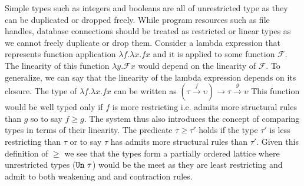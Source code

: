 Simple types such as integers and booleans are all of unrestricted type as
they can be duplicated or dropped freely. While program resources such as file handles, database connections
should be treated as restricted or linear types as we cannot freely duplicate
or drop them. Consider a lambda expression that represents function application $\lambda f. \lambda x. f x$ and it is applied to
some function $\mathcal{F}$. The linearity of this function $\lambda y. \mathcal{F} x$
would depend on the linearity of $\mathcal{F}$. To generalize, we can say that the linearity of the lambda expression depends
on its closure. The type of $\lambda f. \lambda x. f x$ can be written as $(\tau \overset{f}{\rightarrow} \upsilon) \rightarrow \tau \overset{g}{\rightarrow}\upsilon$
This function would be well typed only if $f$ is more restricting i.e. admits more structural rules than $g$ so to say $f \geq g$.
The system thus also introduces the concept of comparing types in terms of
their linearity. The predicate $\tau \geq \tau'$ holds if the type $\tau'$
is less restricting than $\tau$ or to say $\tau$ has admits more structural rules than $\tau'$.
Given this definition of $\geq$ we see that the types form a partially ordered lattice where
unrestricted types ($\texttt{Un}\ \tau$) would be the meet as they are least restricting and
admit to both weakening and and contraction rules.

